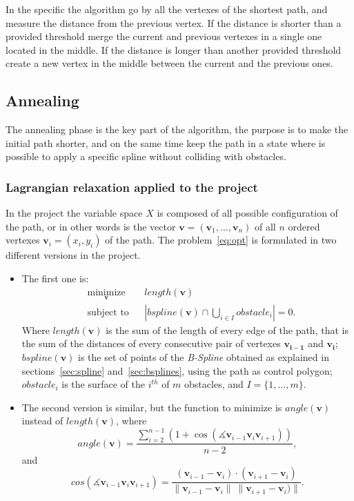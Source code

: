 \documentclass[a4paper]{article}
\begin{document}
In the specific the
algorithm go by all the vertexes of the shortest path, and measure the
distance from the previous vertex. If the distance is shorter than a
provided threshold merge the current and previous vertexes in
a single one located in the middle. If the distance is longer than
another provided threshold create a new vertex in the middle between
the current and the previous ones.

\subsection{Annealing}
The annealing phase is the key part of the algorithm, the purpose is
to make the initial path shorter, and on the same time keep the path
in a state where is possible to apply a specific spline without
colliding with obstacles.

\subsubsection{Lagrangian relaxation applied to the project}
In the project the variable space $X$ is composed of all possible
configuration of the path, or in other words is the vector
$\mathbf{v}=(\mathbf{v}_1,\dots,\mathbf{v}_n)$ of all $n$ ordered
vertexes $\mathbf{v}_i=(x_i,y_i)$ of the
path. The problem~\eqref{eq:opt} is formulated in two different
versions in the project.
\begin{itemize}
\item The first one is:
  \begin{equation*}
    \begin{aligned}
      & \underset{\mathbf{v}}{\text{minimize}}
      & & length(\mathbf{v}) \\
      & \text{subject to}
      & & \left|bspline(\mathbf{v})\cap \bigcup_{i\in I}obstacle_i\right| = 0.
    \end{aligned}
  \end{equation*}
  Where $length(\mathbf{v})$ is the sum of the length of every edge of the
  path, that is the sum of the distances of every consecutive pair of
  vertexes $\mathbf{v_{i-1}}$ and $\mathbf{v_i}$; $bspline(\mathbf{v})$
  is the set of points of the \emph{B-Spline} obtained as explained in
  sections~\ref{sec:spline} and~\ref{sec:bsplines}, using the path as
  control polygon;
  $obstacle_i$ is the surface of the $i^{th}$ of $m$ obstacles, and
  $I=\{1,\dots,m\}$.
\item The second version is similar, but the function to minimize is
  $angle(\mathbf{v})$ instead of $length(\mathbf{v})$, where
  \begin{equation*}
    angle(\mathbf{v}) = \frac{\sum_{i=2}^{n-1}(1+\cos(\measuredangle \mathbf{v}_{i-1}\mathbf{v}_{i}\mathbf{v}_{i+1}))}{n-2},
  \end{equation*}
  and
  \begin{equation*}
    cos(\measuredangle
    \mathbf{v}_{i-1}\mathbf{v}_{i}\mathbf{v}_{i+1})=\frac{(\mathbf{v}_{i-1}-\mathbf{v}_{i})\cdot
      (\mathbf{v}_{i+1}-\mathbf{v}_{i})}{\|\mathbf{v}_{i-1}-\mathbf{v}_{i}\|\
      \|\mathbf{v}_{i+1}-\mathbf{v}_{i})\|}.
  \end{equation*}
\end{itemize}
\end{document}
